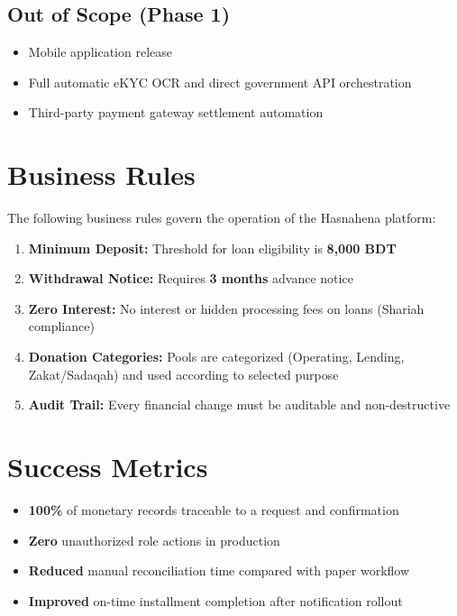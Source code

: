 \documentclass[11pt,a4paper]{article}
\begin{document}
\subsection{Out of Scope (Phase 1)}

\begin{itemize}
    \item Mobile application release
    \item Full automatic eKYC OCR and direct government API orchestration
    \item Third-party payment gateway settlement automation
\end{itemize}

\section{Business Rules}

The following business rules govern the operation of the Hasnahena platform:

\begin{enumerate}
    \item \textbf{Minimum Deposit:} Threshold for loan eligibility is \textbf{8,000 BDT}
    \item \textbf{Withdrawal Notice:} Requires \textbf{3 months} advance notice
    \item \textbf{Zero Interest:} No interest or hidden processing fees on loans (Shariah compliance)
    \item \textbf{Donation Categories:} Pools are categorized (Operating, Lending, Zakat/Sadaqah) and used according to selected purpose
    \item \textbf{Audit Trail:} Every financial change must be auditable and non-destructive
\end{enumerate}

\section{Success Metrics}

\begin{itemize}
    \item \textbf{100\%} of monetary records traceable to a request and confirmation
    \item \textbf{Zero} unauthorized role actions in production
    \item \textbf{Reduced} manual reconciliation time compared with paper workflow
    \item \textbf{Improved} on-time installment completion after notification rollout
\end{itemize}
\end{document}
